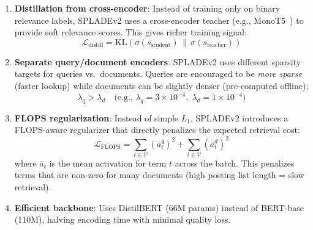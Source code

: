 \begin{enumerate}
  \item \textbf{Distillation from cross-encoder}: Instead of training only on binary relevance labels, SPLADEv2 uses a cross-encoder teacher (e.g., MonoT5~\cite{nogueira2020document}) to provide soft relevance scores. This gives richer training signal: 
\begin{equation}
    \mathcal{L}_{\text{distill}} = \text{KL}\!\left(\sigma(s_{\text{student}}) \,\|\, \sigma(s_{\text{teacher}})\right)
\end{equation}
  \item \textbf{Separate query/document encoders}: SPLADEv2 uses different sparsity targets for queries vs.~documents. Queries are encouraged to be \emph{more sparse} (faster lookup) while documents can be slightly denser (pre-computed offline): 
\begin{equation}
    \lambda_q > \lambda_d \quad \text{(e.g., } \lambda_q = 3 \times 10^{-4},\; \lambda_d = 1 \times 10^{-4}\text{)}
\end{equation}
  \item \textbf{FLOPS regularization}: Instead of simple $L_1$, SPLADEv2 introduces a FLOPS-aware regularizer that directly penalizes the expected retrieval cost: 
\begin{equation}
    \mathcal{L}_{\text{FLOPS}} = \sum_{t \in \mathcal{V}} \left(\overline{a}_t^q\right)^2 + \sum_{t \in \mathcal{V}} \left(\overline{a}_t^d\right)^2
\end{equation}
 where $\overline{a}_t$ is the mean activation for term $t$ across the batch. This penalizes terms that are non-zero for many documents (high posting list length = slow retrieval).
  \item \textbf{Efficient backbone}: Uses DistilBERT (66M params) instead of BERT-base (110M), halving encoding time with minimal quality loss.
\end{enumerate}

\begin{keybox}
\end{keybox}

